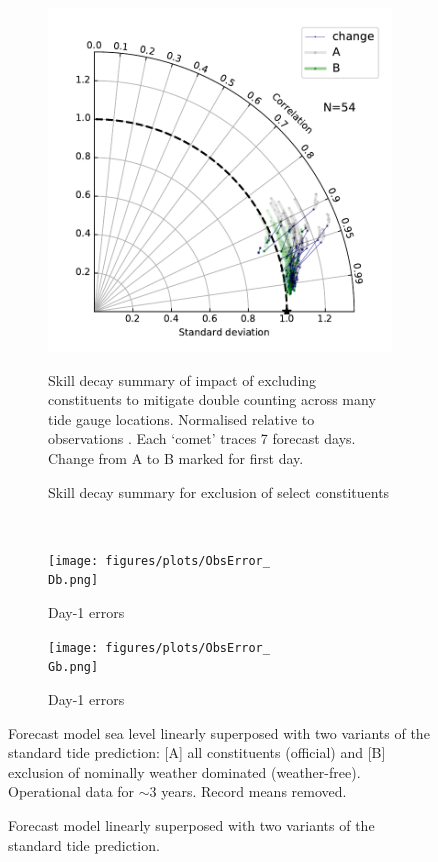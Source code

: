 \begin{figure}[h]\centering
    \begin{subfigure}[b]{\figwidthBig}
        \includegraphics[width=\textwidth]{figures/plots/taylorDoubleCount.pdf}
        \caption{Skill decay summary for exclusion of select constituents}
        {Skill decay summary of impact of excluding constituents to mitigate double counting across many tide gauge locations. Normalised relative to observations \citep{Taylor:2000wp}. Each `comet' traces 7 forecast days.  Change from A to B marked for first day.}   
    \end{subfigure}
    \\
    \begin{subfigure}[b]{\figwidthHalf}
        \texttt{[image: figures/plots/ObsError\_\\Db.png]}
        \caption{Day-1 errors \Dname{}}
    \end{subfigure}
    \begin{subfigure}[b]{\figwidthHalf}
        \texttt{[image: figures/plots/ObsError\_\\Gb.png]}
        \caption{Day-1 errors \Gname{}}
    \end{subfigure}
    
    \caption{Forecast model linearly superposed with two variants of the standard tide prediction.}
    {Forecast model sea level linearly superposed with two variants of the standard tide prediction: [A] all constituents (official) and [B] exclusion of nominally weather dominated (weather-free).  Operational data for $\sim3$ years. Record means removed.} 
    \label{fig:aggStats}
\end{figure}   


